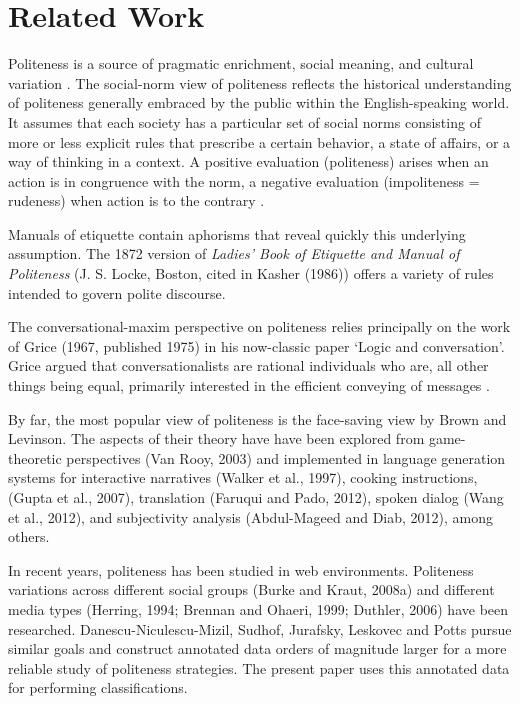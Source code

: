 \documentclass[conference]{IEEEtran}
\begin{document}
\section{Related Work}
Politeness is a source of pragmatic enrichment, social meaning, and cultural variation \cite{Jurafsky}. The social-norm view of politeness reflects the historical understanding of politeness generally embraced by the public within the English-speaking world. It assumes that each society has a particular set of social norms consisting of more or less explicit rules that prescribe a certain behavior, a state of affairs, or a way of thinking in a context. A positive evaluation (politeness) arises when an action is in congruence with the norm, a negative evaluation (impoliteness = rudeness) when action is to the contrary \cite{Fraser}.

Manuals of etiquette contain aphorisms that reveal quickly this underlying assumption. The 1872 version of \textit{Ladies' Book of Etiquette and Manual of Politeness} (J. S. Locke, Boston, cited in Kasher (1986)) offers a variety of rules intended to govern polite discourse.

The conversational-maxim perspective on politeness relies principally on the work of Grice (1967, published 1975) in his now-classic paper `Logic and conversation'. Grice argued that conversationalists are rational individuals who are, all other things being equal, primarily interested in the efficient conveying of messages \cite{Fraser}.

By far, the most popular view of politeness is the face-saving view by Brown and Levinson. The aspects of their theory have have been explored from game-theoretic perspectives (Van Rooy, 2003) and implemented in language generation systems for interactive narratives (Walker et al., 1997), cooking instructions, (Gupta et al., 2007), translation (Faruqui and Pado, 2012), spoken dialog (Wang et al., 2012), and subjectivity analysis (Abdul-Mageed and Diab, 2012), among others.

In recent years, politeness has been studied in web environments. Politeness variations across different social groups (Burke and Kraut, 2008a) and different media types (Herring, 1994; Brennan and Ohaeri, 1999; Duthler, 2006) have been researched. Danescu-Niculescu-Mizil, Sudhof, Jurafsky, Leskovec and Potts \cite{Jurafsky} pursue similar goals and construct annotated data orders of magnitude larger for a more reliable study of politeness strategies. The present paper uses this annotated data for performing classifications.
\end{document}
